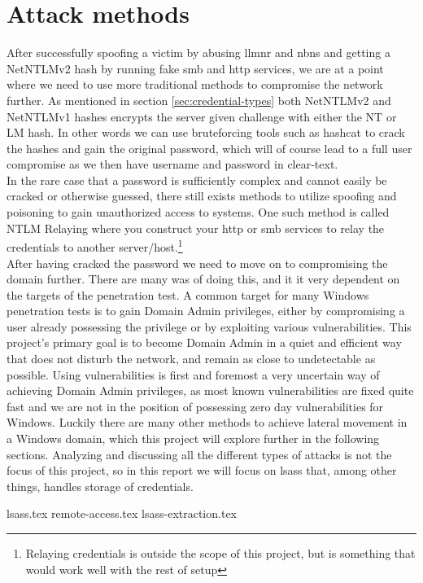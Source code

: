 \documentclass{article}
\begin{document}
\section{Attack methods}
\label{sec:attack-methods}
After successfully spoofing a victim by abusing \gls{llmnr} and \gls{nbns} and getting a NetNTLMv2 hash by running fake \gls{smb} and \gls{http} services, we are at a point where we need to use more traditional methods to compromise the network further. As mentioned in section \ref{sec:credential-types} both NetNTLMv2 and NetNTLMv1 hashes encrypts the server given challenge with either the NT or LM hash. In other words we can use bruteforcing tools such as hashcat\cite{url:hashes:hashcat-example-hashes} to crack the hashes and gain the original password, which will of course lead to a full user compromise as we then have username and password in clear-text.
\\
In the rare case that a password is sufficiently complex and cannot easily be cracked or otherwise guessed, there still exists methods to utilize spoofing and poisoning to gain unauthorized access to systems. One such method is called NTLM Relaying\cite{url:ntlm-relaying} where you construct your \gls{http} or \gls{smb} services to relay the credentials to another server/host.\footnote{Relaying credentials is outside the scope of this project, but is something that would work well with the rest of setup}
\\
After having cracked the password we need to move on to compromising the domain further. There are many was of doing this, and it it very dependent on the targets of the penetration test. A common target for many Windows penetration tests is to gain Domain Admin privileges, either by compromising a user already possessing the privilege or by exploiting various vulnerabilities. This project's primary goal is to become Domain Admin in a quiet and efficient way that does not disturb the network, and remain as close to undetectable as possible. Using vulnerabilities is first and foremost a very uncertain way of achieving Domain Admin privileges, as most known vulnerabilities are fixed quite fast and we are not in the position of possessing zero day vulnerabilities for Windows. Luckily there are many other methods to achieve lateral movement in a Windows domain, which this project will explore further in the following sections. Analyzing and discussing all the different types of attacks is not the focus of this project, so in this report we will focus on \gls{lsass} that, among other things, handles storage of credentials.

{lsass.tex}
{remote-access.tex}
{lsass-extraction.tex}
\end{document}
